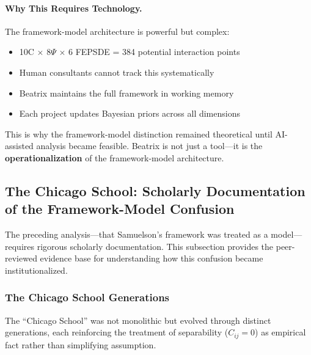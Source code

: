 \paragraph{Why This Requires Technology.}

The framework-model architecture is powerful but complex:
\begin{itemize}[nosep]
    \item 10C $\times$ 8$\Psi$ $\times$ 6 FEPSDE = 384 potential interaction points
    \item Human consultants cannot track this systematically
    \item Beatrix maintains the full framework in working memory
    \item Each project updates Bayesian priors across all dimensions
\end{itemize}

This is why the framework-model distinction remained theoretical until AI-assisted
analysis became feasible. Beatrix is not just a tool---it is the \textbf{operationalization}
of the framework-model architecture.



\subsection{The Chicago School: Scholarly Documentation of the Framework-Model Confusion}
\label{sec:meta-chicago}

The preceding analysis---that Samuelson's framework was treated as a model---requires
rigorous scholarly documentation. This subsection provides the peer-reviewed evidence
base for understanding how this confusion became institutionalized.

\subsubsection{The Chicago School Generations}

The ``Chicago School'' was not monolithic but evolved through distinct generations,
each reinforcing the treatment of separability ($C_{ij} = 0$) as empirical fact
rather than simplifying assumption.

